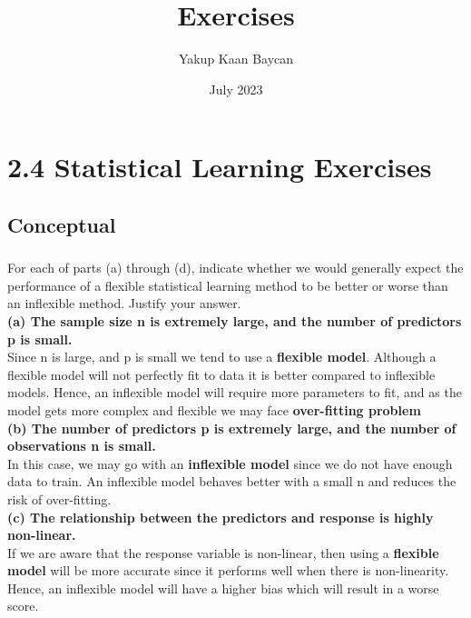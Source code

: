 \documentclass{article}
\title{Exercises}
\author{Yakup Kaan Baycan}
\date{July 2023}
\begin{document}
\maketitle

\section{2.4 Statistical Learning Exercises}
\subsection{Conceptual}
\subsubsection{} For each of parts (a) through (d), indicate whether we would generally expect the performance of a flexible statistical learning method to be better or worse than an inflexible method. Justify your answer.\\

\textbf{(a) The sample size n is extremely large, and the number of predictors p is small.} \\

Since n is large, and p is small we tend to use a \textbf{flexible model}. Although a flexible model will not perfectly fit to data it is better compared to inflexible models. Hence, an inflexible model will require more parameters to fit, and as the model gets more complex and flexible we may face \textbf{over-fitting problem} \\

\textbf{(b) The number of predictors p is extremely large, and the number
of observations n is small.}\\

In this case, we may go with an \textbf{inflexible model} since we do not have enough data to train. An inflexible model behaves better with a small n and reduces the risk of over-fitting.\\

\textbf{(c) The relationship between the predictors and response is highly
non-linear.}\\

If we are aware that the response variable is non-linear, then using a \textbf{flexible model} will be more accurate since it performs well when there is non-linearity. Hence, an inflexible model will have a higher bias which will result in a worse score.\\
\end{document}
